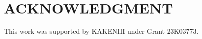 \documentclass[]{interact}
\theoremstyle{plain}%
\theoremstyle{definition}
\theoremstyle{remark}
\begin{document}



%

\section*{ACKNOWLEDGMENT}

This work was supported by KAKENHI under Grant 23K03773.


\end{document}
